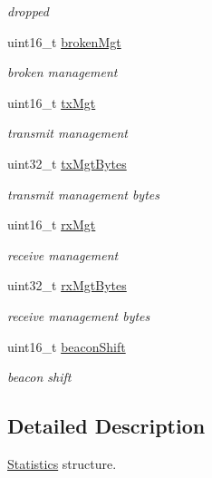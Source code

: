 \begin{DoxyCompactItemize}
\begin{DoxyCompactList}\small\item\em dropped \end{DoxyCompactList}\item 
uint16\+\_\+t \hyperlink{structns3_1_1dot11s_1_1PeerManagementProtocolMac_1_1Statistics_a7ec552294be33835a15ec7002fe5d723}{broken\+Mgt}
\begin{DoxyCompactList}\small\item\em broken management \end{DoxyCompactList}\item 
uint16\+\_\+t \hyperlink{structns3_1_1dot11s_1_1PeerManagementProtocolMac_1_1Statistics_aca8d471dcea8a661adac26f971ccbd36}{tx\+Mgt}
\begin{DoxyCompactList}\small\item\em transmit management \end{DoxyCompactList}\item 
uint32\+\_\+t \hyperlink{structns3_1_1dot11s_1_1PeerManagementProtocolMac_1_1Statistics_a6fb1958b783dd095597f2c66c5276f01}{tx\+Mgt\+Bytes}
\begin{DoxyCompactList}\small\item\em transmit management bytes \end{DoxyCompactList}\item 
uint16\+\_\+t \hyperlink{structns3_1_1dot11s_1_1PeerManagementProtocolMac_1_1Statistics_a81b9bf9b57ca90e50875074957f9fc43}{rx\+Mgt}
\begin{DoxyCompactList}\small\item\em receive management \end{DoxyCompactList}\item 
uint32\+\_\+t \hyperlink{structns3_1_1dot11s_1_1PeerManagementProtocolMac_1_1Statistics_adc42ee988c9fedca9588af7e403046f0}{rx\+Mgt\+Bytes}
\begin{DoxyCompactList}\small\item\em receive management bytes \end{DoxyCompactList}\item 
uint16\+\_\+t \hyperlink{structns3_1_1dot11s_1_1PeerManagementProtocolMac_1_1Statistics_acef3a393e72e50f8b2e519385976df30}{beacon\+Shift}
\begin{DoxyCompactList}\small\item\em beacon shift \end{DoxyCompactList}\end{DoxyCompactItemize}


\subsection{Detailed Description}
\hyperlink{structns3_1_1dot11s_1_1PeerManagementProtocolMac_1_1Statistics}{Statistics} structure. 

